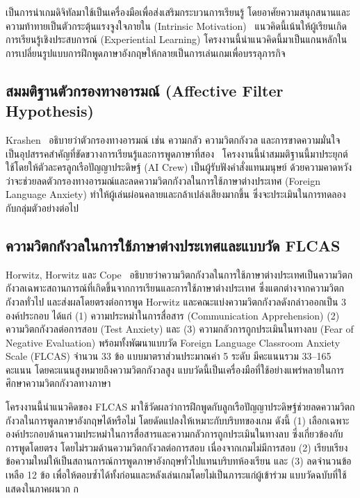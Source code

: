 เป็นการนำเกมดิจิทัลมาใช้เป็นเครื่องมือเพื่อส่งเสริมกระบวนการเรียนรู้ โดยอาศัยความสนุกสนานและความท้าทายเป็นตัวกระตุ้นแรงจูงใจภายใน (Intrinsic Motivation)~\cite{prensky2001} แนวคิดนี้เน้นให้ผู้เรียนเกิดการเรียนรู้เชิงประสบการณ์ (Experiential Learning) โครงงานนี้นำแนวคิดนี้มาเป็นแกนหลักในการเปลี่ยนรูปแบบการฝึกพูดภาษาอังกฤษให้กลายเป็นการเล่นเกมเพื่อบรรลุภารกิจ

\subsection{สมมติฐานตัวกรองทางอารมณ์ (Affective Filter Hypothesis)}

Krashen~\cite{krashen1982} อธิบายว่าตัวกรองทางอารมณ์ เช่น ความกลัว ความวิตกกังวล และการขาดความมั่นใจ เป็นอุปสรรคสำคัญที่ขัดขวางการเรียนรู้และการพูดภาษาที่สอง~\cite{sadigzade2025} โครงงานนี้นำสมมติฐานนี้มาประยุกต์ใช้โดยให้ตัวละครลูกเรือปัญญาประดิษฐ์ (AI Crew) เป็นผู้รับฟังคำสั่งแทนมนุษย์ ด้วยความคาดหวังว่าจะช่วยลดตัวกรองทางอารมณ์และลดความวิตกกังวลในการใช้ภาษาต่างประเทศ (Foreign Language Anxiety) ทำให้ผู้เล่นผ่อนคลายและกล้าเปล่งเสียงมากขึ้น ซึ่งจะประเมินในการทดลองกับกลุ่มตัวอย่างต่อไป

\subsection{ความวิตกกังวลในการใช้ภาษาต่างประเทศและแบบวัด FLCAS}

Horwitz, Horwitz และ Cope~\cite{horwitz1986} อธิบายว่าความวิตกกังวลในการใช้ภาษาต่างประเทศเป็นความวิตกกังวลเฉพาะสถานการณ์ที่เกิดขึ้นจากการเรียนและการใช้ภาษาต่างประเทศ ซึ่งแตกต่างจากความวิตกกังวลทั่วไป และส่งผลโดยตรงต่อการพูด Horwitz และคณะแบ่งความวิตกกังวลดังกล่าวออกเป็น 3 องค์ประกอบ ได้แก่ (1) ความประหม่าในการสื่อสาร (Communication Apprehension) (2) ความวิตกกังวลต่อการสอบ (Test Anxiety) และ (3) ความกลัวการถูกประเมินในทางลบ (Fear of Negative Evaluation) พร้อมทั้งพัฒนาแบบวัด Foreign Language Classroom Anxiety Scale (FLCAS) จำนวน 33 ข้อ แบบมาตราส่วนประมาณค่า 5 ระดับ มีคะแนนรวม 33--165 คะแนน โดยคะแนนสูงหมายถึงความวิตกกังวลสูง แบบวัดนี้เป็นเครื่องมือที่ใช้อย่างแพร่หลายในการศึกษาความวิตกกังวลทางภาษา

โครงงานนี้นำแนวคิดของ FLCAS มาใช้วัดผลว่าการฝึกพูดกับลูกเรือปัญญาประดิษฐ์ช่วยลดความวิตกกังวลในการพูดภาษาอังกฤษได้หรือไม่ โดยดัดแปลงให้เหมาะกับบริบทของเกม ดังนี้ (1) เลือกเฉพาะองค์ประกอบด้านความประหม่าในการสื่อสารและความกลัวการถูกประเมินในทางลบ ซึ่งเกี่ยวข้องกับการพูดโดยตรง โดยไม่รวมด้านความวิตกกังวลต่อการสอบ เนื่องจากเกมไม่มีการสอบ (2) เรียบเรียงข้อความใหม่ให้เป็นสถานการณ์การพูดภาษาอังกฤษทั่วไปแทนบริบทห้องเรียน และ (3) ลดจำนวนข้อเหลือ 12 ข้อ เพื่อให้ตอบซ้ำได้ทั้งก่อนและหลังเล่นเกมโดยไม่เป็นภาระแก่ผู้เข้าร่วม แบบวัดฉบับที่ใช้แสดงในภาคผนวก ก

